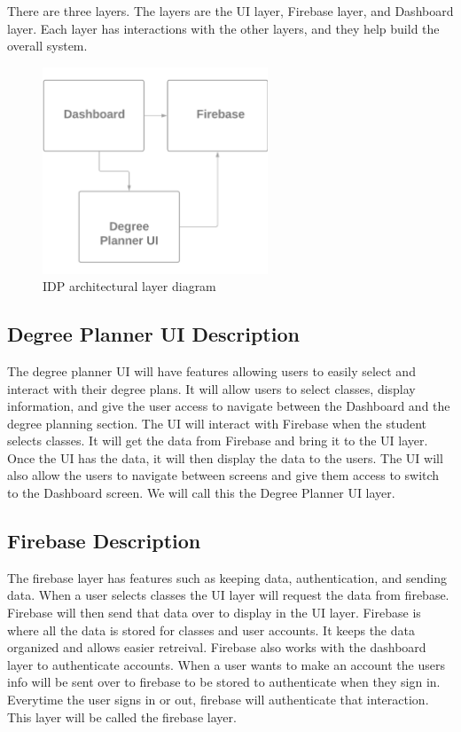 There are three layers. The layers are the UI layer, Firebase layer, and Dashboard layer. Each layer has interactions with the other layers, and they help build the overall system. 
\begin{figure}[h!]
	\centering
 	\includegraphics[width=0.60\textwidth]{images/system_overview_pic}
 \caption{IDP architectural layer diagram}
\end{figure}

\subsection{Degree Planner UI Description}
    The degree planner UI will have features allowing users to easily select and interact with their degree plans. It will allow users to select classes, display information, and give the user access to navigate between the Dashboard and the degree planning section. The UI will interact with Firebase when the student selects classes. It will get the data from Firebase and bring it to the UI layer. Once the UI has the data, it will then display the data to the users. The UI will also allow the users to navigate between screens and give them access to switch to the Dashboard screen. We will call this the Degree Planner UI layer.

\subsection{Firebase Description}
    The firebase layer has features such as keeping data, authentication, and sending data. When a user selects classes the UI layer will request the data from firebase. Firebase will then send that data over to display in the UI layer. Firebase is where all the data is stored for classes and user accounts. It keeps the data organized and allows easier retreival. Firebase also works with the dashboard layer to authenticate accounts. When a user wants to make an account the users info will be sent over to firebase to be stored to authenticate when they sign in. Everytime the user signs in or out, firebase will authenticate that interaction. This layer will be called the firebase layer. 

